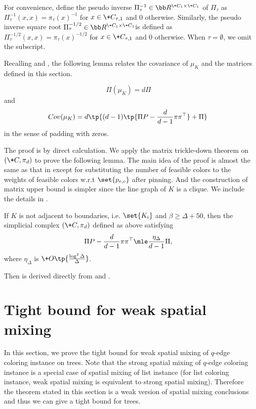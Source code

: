 \documentclass[a4paper,11pt]{article}
\begin{document}
For convenience, define the pseudo inverse $\Pi_\tau^{-1} \in \bb R^{\+C_1\times\+C_1}$ of $\Pi_\tau$ as $\Pi_\tau^{-1}(x,x)=\pi_\tau(x)^{-1}$ for $x\in \+C_{\tau,1}$ and $0$ otherwise. Similarly, the pseudo inverse square root $\Pi_\tau^{-1/2} \in \bb R^{\+C_1\times\+C_1}$is defined as $\Pi_\tau^{-1/2}(x,x)=\pi_\tau(x)^{-1/2}$ for $x\in \+C_{\tau,1}$ and $0$ otherwise. When $\tau=\emptyset$, we omit the subscript.

Recalling  and , 
the following lemma relates the covariance of $\mu_K$ and the matrices defined in this section.
\begin{proposition}\label{lem:mtd-to-si}
    \[
    \Pi(\mu_K)=d\Pi
    \]
    and
    \[
    \!{Cov}(\mu_K) =d \tp{(d-1) \tp{\Pi P -\frac{d}{d-1}\pi \pi^\top} + \Pi}
    \]
    in the sense of padding with zeros.
\end{proposition}
The proof is by direct calculation.
We apply the matrix trickle-down theorem on $(\+C,\pi_d)$ to prove the following lemma. The main idea of the proof is almost the same as that in \cite{WZZ24} except for substituting the number of feasible colors to the weights of feasible colors w.r.t $\set{p_{e,c}}$ after pinning. And the construction of matrix upper bound is simpler since the line graph of $K$ is a clique. We include the details in .
\begin{lemma}\label{lem:PiP-bound}
    If $K$ is not adjacent to boundaries, i.e. $\set{K_i}$ and $\beta \geq \Delta + 50$, then the simplicial complex $(\+C,\pi_d)$ defined as above satisfying
    \[
    \Pi P -\frac{d}{d-1}\pi \pi^\top \mle \frac{\eta_{\Delta}}{d-1} \Pi ,
    \]
    where $\eta_{\Delta}$ is $\+O\tp{\frac{\log^2 \Delta}{\Delta}}$.
\end{lemma}
Then  is derived directly from  and .
 \section{Tight bound for weak spatial mixing}\label{sec:wsm}
In this section, we prove the tight bound for weak spatial mixing  of $q$-edge coloring instance on trees.
Note that the strong spatial mixing of $q$-edge coloring instance is a special case of spatial mixing of list instance (for list coloring instance, weak spatial mixing is equivalent to strong spatial mixing).
Therefore the theorem stated in this section is a weak version of spatial mixing conclusions and thus we can give a tight bound for trees. 
\end{document}
